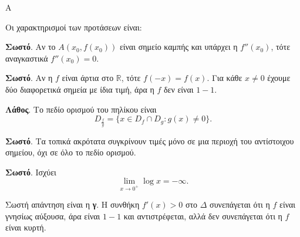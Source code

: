 \begin{thema}{Α}
\begin{erwthma}
\item {}

\item {}

\item {}

\item Οι χαρακτηρισμοί των προτάσεων είναι:
\begin{alist}
\item \textbf{Σωστό}. Αν το $A(x_0,f(x_0))$ είναι σημείο καμπής και υπάρχει η $f''(x_0)$, τότε αναγκαστικά $f''(x_0)=0$.
\item \textbf{Σωστό}. Αν η $f$ είναι άρτια στο $\mathbb{R}$, τότε $f(-x)=f(x)$. Για κάθε $x\neq0$ έχουμε δύο διαφορετικά σημεία με ίδια τιμή, άρα η $f$ δεν είναι $1-1$.
\item \textbf{Λάθος}. Το πεδίο ορισμού του πηλίκου είναι
\[ D_{\frac{f}{g}}=\{x\in D_f\cap D_g:g(x)\neq0\}. \]
\item \textbf{Σωστό}. Τα τοπικά ακρότατα συγκρίνουν τιμές μόνο σε μια περιοχή του αντίστοιχου σημείου, όχι σε όλο το πεδίο ορισμού.
\item \textbf{Σωστό}. Ισχύει
\[ \lim_{x\to0^+}\log{x}=-\infty. \]
\end{alist}

\item Σωστή απάντηση είναι η \textbf{γ}. Η συνθήκη $f'(x)>0$ στο $\Delta$ συνεπάγεται ότι η $f$ είναι γνησίως αύξουσα, άρα είναι $1-1$ και αντιστρέφεται, αλλά δεν συνεπάγεται ότι η $f$ είναι κυρτή.
\end{erwthma}
\end{thema}

